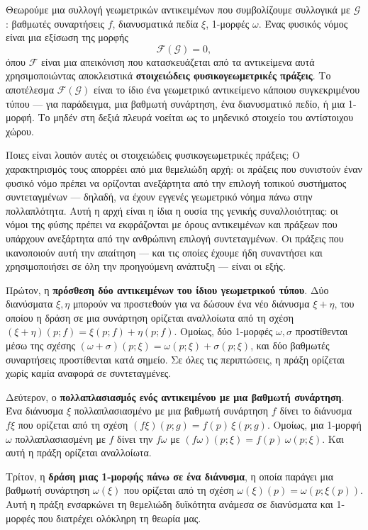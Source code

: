 \documentclass[12pt]{article}
\begin{document}
Θεωρούμε μια συλλογή γεωμετρικών αντικειμένων που συμβολίζουμε συλλογικά με $\mathcal{G}$: βαθμωτές συναρτήσεις $f$, διανυσματικά πεδία $\xi$, 1-μορφές $\omega$. Ένας φυσικός νόμος είναι μια εξίσωση της μορφής
\[
\mathcal{F}(\mathcal{G}) = 0, \tag{0.34}
\]
όπου $\mathcal{F}$ είναι μια απεικόνιση που κατασκευάζεται από τα αντικείμενα αυτά χρησιμοποιώντας αποκλειστικά \textbf{στοιχειώδεις φυσικογεωμετρικές πράξεις}. Το αποτέλεσμα $\mathcal{F}(\mathcal{G})$ είναι το ίδιο ένα γεωμετρικό αντικείμενο κάποιου συγκεκριμένου τύπου — για παράδειγμα, μια βαθμωτή συνάρτηση, ένα διανυσματικό πεδίο, ή μια 1-μορφή. Το μηδέν στη δεξιά πλευρά νοείται ως το μηδενικό στοιχείο του αντίστοιχου χώρου.

Ποιες είναι λοιπόν αυτές οι στοιχειώδεις φυσικογεωμετρικές πράξεις; Ο χαρακτηρισμός τους απορρέει από μια θεμελιώδη αρχή: οι πράξεις που συνιστούν έναν φυσικό νόμο πρέπει να ορίζονται ανεξάρτητα από την επιλογή τοπικού συστήματος συντεταγμένων — δηλαδή, να έχουν εγγενές γεωμετρικό νόημα πάνω στην πολλαπλότητα. Αυτή η αρχή είναι η ίδια η ουσία της γενικής συναλλοιότητας: οι νόμοι της φύσης πρέπει να εκφράζονται με όρους αντικειμένων και πράξεων που υπάρχουν ανεξάρτητα από την ανθρώπινη επιλογή συντεταγμένων. Οι πράξεις που ικανοποιούν αυτή την απαίτηση — και τις οποίες έχουμε ήδη συναντήσει και χρησιμοποιήσει σε όλη την προηγούμενη ανάπτυξη — είναι οι εξής.

Πρώτον, η \textbf{πρόσθεση δύο αντικειμένων του ίδιου γεωμετρικού τύπου}. Δύο διανύσματα $\xi, \eta$ μπορούν να προστεθούν για να δώσουν ένα νέο διάνυσμα $\xi + \eta$, του οποίου η δράση σε μια συνάρτηση ορίζεται αναλλοίωτα από τη σχέση $(\xi + \eta)(p; f) = \xi(p; f) + \eta(p; f)$. Ομοίως, δύο 1-μορφές $\omega, \sigma$ προστίθενται μέσω της σχέσης $(\omega + \sigma)(p; \xi) = \omega(p; \xi) + \sigma(p; \xi)$, και δύο βαθμωτές συναρτήσεις προστίθενται κατά σημείο. Σε όλες τις περιπτώσεις, η πράξη ορίζεται χωρίς καμία αναφορά σε συντεταγμένες.

Δεύτερον, ο \textbf{πολλαπλασιασμός ενός αντικειμένου με μια βαθμωτή συνάρτηση}. Ένα διάνυσμα $\xi$ πολλαπλασιασμένο με μια βαθμωτή συνάρτηση $f$ δίνει το διάνυσμα $f \xi$ που ορίζεται από τη σχέση $(f \xi)(p; g) = f(p) \, \xi(p; g)$. Ομοίως, μια 1-μορφή $\omega$ πολλαπλασιασμένη με $f$ δίνει την $f \omega$ με $(f \omega)(p; \xi) = f(p) \, \omega(p; \xi)$. Και αυτή η πράξη ορίζεται αναλλοίωτα.

Τρίτον, η \textbf{δράση μιας 1-μορφής πάνω σε ένα διάνυσμα}, η οποία παράγει μια βαθμωτή συνάρτηση $\omega(\xi)$ που ορίζεται από τη σχέση $\omega(\xi)(p) = \omega(p; \xi(p))$. Αυτή η πράξη ενσαρκώνει τη θεμελιώδη δυϊκότητα ανάμεσα σε διανύσματα και 1-μορφές που διατρέχει ολόκληρη τη θεωρία μας.
\end{document}
